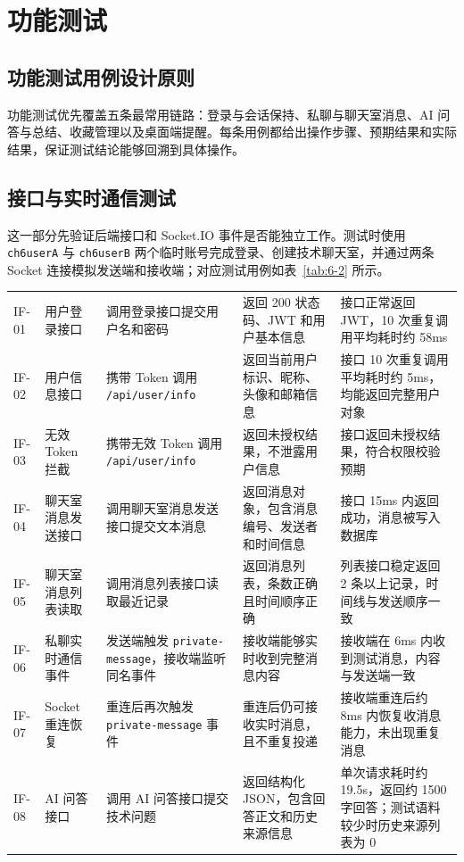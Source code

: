 \section{功能测试}

\subsection{功能测试用例设计原则}

功能测试优先覆盖五条最常用链路：登录与会话保持、私聊与聊天室消息、AI 问答与总结、收藏管理以及桌面端提醒。每条用例都给出操作步骤、预期结果和实际结果，保证测试结论能够回溯到具体操作。

\subsection{接口与实时通信测试}

这一部分先验证后端接口和 Socket.IO 事件是否能独立工作。测试时使用 \texttt{ch6userA} 与 \texttt{ch6userB} 两个临时账号完成登录、创建技术聊天室，并通过两条 Socket 连接模拟发送端和接收端；对应测试用例如表~\ref{tab:6-2} 所示。

\renewcommand{\arraystretch}{1.08}
\setlength{\tabcolsep}{0.55ex}
\small
\begin{longtable}{M{0.12\textwidth}p{0.16\textwidth}p{0.18\textwidth}p{0.18\textwidth}p{0.23\textwidth}}
IF-01 & 用户登录接口 & 调用登录接口提交用户名和密码 & 返回 200 状态码、JWT 和用户基本信息 & 接口正常返回 JWT，10 次重复调用平均耗时约 58ms \\
IF-02 & 用户信息接口 & 携带 Token 调用 \texttt{/api/user/info} & 返回当前用户标识、昵称、头像和邮箱信息 & 接口 10 次重复调用平均耗时约 5ms，均能返回完整用户对象 \\
IF-03 & 无效 Token 拦截 & 携带无效 Token 调用 \texttt{/api/user/info} & 返回未授权结果，不泄露用户信息 & 接口返回未授权结果，符合权限校验预期 \\
IF-04 & 聊天室消息发送接口 & 调用聊天室消息发送接口提交文本消息 & 返回消息对象，包含消息编号、发送者和时间信息 & 接口 15ms 内返回成功，消息被写入数据库 \\
IF-05 & 聊天室消息列表读取 & 调用消息列表接口读取最近记录 & 返回消息列表，条数正确且时间顺序正确 & 列表接口稳定返回 2 条以上记录，时间线与发送顺序一致 \\
IF-06 & 私聊实时通信事件 & 发送端触发 \texttt{private-message}，接收端监听同名事件 & 接收端能够实时收到完整消息内容 & 接收端在 6ms 内收到测试消息，内容与发送端一致 \\
IF-07 & Socket 重连恢复 & 重连后再次触发 \texttt{private-message} 事件 & 重连后仍可接收实时消息，且不重复投递 & 接收端重连后约 8ms 内恢复收消息能力，未出现重复消息 \\
IF-08 & AI 问答接口 & 调用 AI 问答接口提交技术问题 & 返回结构化 JSON，包含回答正文和历史来源信息 & 单次请求耗时约 19.5s，返回约 1500 字回答；测试语料较少时历史来源列表为 0 \\
\end{longtable}
\normalsize
\FloatBarrier

